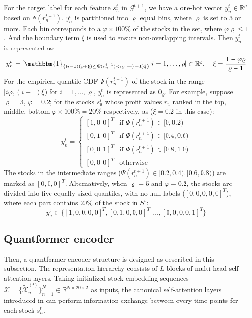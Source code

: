 \documentclass[preprint,12pt]{elsarticle}
\begin{document}
 For the target label for each feature $s^t_n$ in $\mathcal{G}^{t+1}$, we have a one-hot vector $y^t_n \in \mathbb{R}^{\varrho}$ based on $\Psi(r^{t+1}_n)$. $y^t_n$ is partitioned into $\varrho$ equal bins, where $\varrho$ is set to 3 or more. Each bin corresponds to a $\varphi \times100\%$ of the stocks in the set, where $\varphi\varrho \leq 1$. And the boundary term $\xi$ is used to ensure non-overlapping intervals. Then $y^t_n$ is represented as:
$$
y^t_n=[\mathbbm{1}_{\{ (i-1)(\varrho+\xi) \leq \Psi(r^{t+1}_n) < i\varrho\ + (i-1)\xi\}}  \vert i = 1, \dots, \varrho] \in \mathbb{R}^{\varrho}, \quad \xi = \frac{1-\varphi \varrho}{\varrho-1}
$$
For the empirical quantile CDF $\Psi(r^{t+1}_n)$ of the stock in the range $[i\varphi,(i+1)\xi)$ for $i = 1, \ldots, \varrho$, $y^t_n$ is represented as $\mathbf{0}_{\varrho}$. For example, suppose $\varrho = 3$, $\varphi = 0.2$; for the stocks $s^t_n$ whose profit values $r^t_n$ ranked in the top, middle, bottom $\varphi \times 100\% = 20\%$ respectively, as ($\xi = 0.2$ in this case):
\[
y_n^t =
\begin{cases}
[1, 0, 0]^T & \text{if } \Psi(r_n^{t+1}) \in [0, 0.2) \\
[0, 1, 0]^T & \text{if } \Psi(r_n^{t+1}) \in [0.4, 0.6) \\
[0, 0, 1]^T & \text{if } \Psi(r_n^{t+1}) \in [0.8, 1.0) \\
[0, 0, 0]^T & \text{otherwise}
\end{cases}
\]
The stocks in the intermediate ranges ($\Psi(r^{t+1}_n) \in [0.2, 0.4), [0.6, 0.8)$) are marked as $[0,0,0]^T$. Alternatively, when $\varrho = 5$ and $\varphi =0.2$, the stocks are divided into five equally sized quantiles, with no null labels ($[0,0,0,0,0]^T$), where  each part contains $20\%$ of the stock in $S^t$:
$$y^{t}_{n} \in \{ [1,0,0,0,0]^T, [0,1,0,0,0]^T, \ldots, [0,0,0,0,1]^T\}$$


\subsection{Quantformer encoder}
\label{encoder}
Then, a quantformer encoder structure is designed as described in this subsection. The representation hierarchy consists of $L$ blocks of multi-head self-attention layers. Taking initialized stock embedding sequences $\mathcal{X} = \{\tilde{\mathcal{X}}^{(t)}_n\}^N_{n=1} \in \mathbb{R}^{N\times20\times2}$ as inputs, the canonical self-attention layers introduced in \citet{10.5555/3295222.3295349} can perform information exchange between every time points for each stock $s^t_n$.
\end{document}
